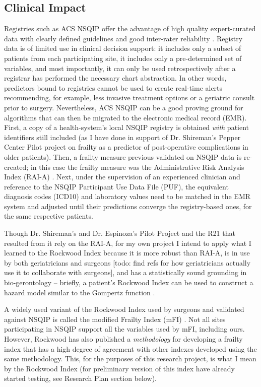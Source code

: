 \subsection{Clinical Impact}\label{clinical-impact}
Registries such as ACS NSQIP offer the advantage of high quality expert-curated data with clearly defined guidelines and good inter-rater reliability \cite{Shiloach_2010}. Registry data is of limited use in clinical decision support: it includes only a subset of patients from each participating site, it includes only a pre-determined set of variables, and most importantly, it can only be used retrospectively after a registrar has performed the necessary chart abstraction. In other words, predictors bound to registries cannot be used to create real-time alerts recommending, for example, less invasive treatment options or a geriatric consult prior to surgery. Nevertheless, ACS NSQIP can be a good proving ground for algorithms that can then be migrated to the electronic medical record (EMR). First, a copy of a health-system's local NSQIP registry is obtained \textit{with} patient identifiers still included (as I have done in support of Dr. Shireman's Pepper Center Pilot project on frailty as a predictor of post-operative complications in older patients). Then, a frailty measure previous validated on NSQIP data is re-created; in this case the frailty measure was the Administrative Risk Analysis Index (RAI-A) \cite{Hall_2017,Johnson_2014,Melin_2015,Gupta_2011}. Next, under the supervision of an experienced clinician and reference to the NSQIP Participant Use Data File (PUF), the equivalent diagnosis codes (ICD10) and laboratory values need to be matched in the EMR system and adjusted until their predictions converge the registry-based ones, for the same respective patients.

Though Dr. Shireman's and Dr. Espinoza's Pilot Project and the R21 that resulted from it rely on the RAI-A, for my own project I intend to apply what I learned to the Rockwood Index because it is more robust than RAI-A, is in use by both geriatricians and surgeons [todo: find refs for how geriatricians actually use it to collaborate with surgeons], and has a statistically sound grounding in bio-gerontology -- briefly, a patient's Rockwood Index can be used to construct a hazard model  \cite{Mitnitski_2001} similar to the Gompertz function \cite{Mueller_1995,Pletcher_2000,Bokov_2017}.

A widely used variant of the Rockwood Index used by surgeons and validated against NSQIP is called the modified Frailty Index (mFI) \cite{Uppal_2015,Tsiouris_2013,Bellamy_2017,22491599,23711971,23949353}. Not all sites participating in NSQIP support all the variables used by mFI, including ours. However, Rockwood has also published a \textit{methodology} for developing a frailty index that has a high degree of agreement with other indexes developed using the same methodology. This, for the purposes of this research project, is what I mean by the Rockwood Index (for preliminary version of this index have already started testing, see Research Plan section below).

